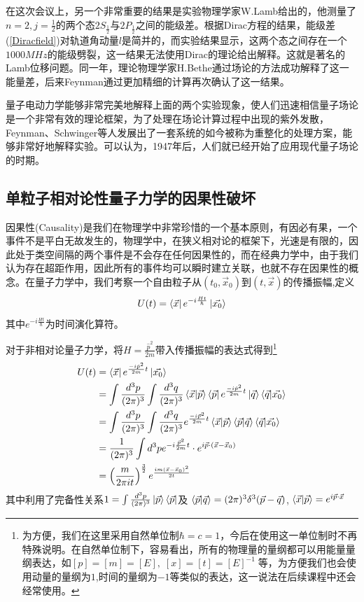 在这次会议上，另一个非常重要的结果是实验物理学家W.Lamb给出的，他测量了$n=2,j=\frac{1}{2}$的两个态$2S_{\frac{1}{2}}$与$2P_{\frac{1}{2}}$之间的能级差。根据Dirac方程的结果，能级差(\ref{Diracfield})对轨道角动量$l$是简并的，而实验结果显示，这两个态之间存在一个$1000MHz$的能级劈裂，这一结果无法使用Dirac的理论给出解释。这就是著名的Lamb位移问题。同一年，理论物理学家H.Bethe通过场论的方法成功解释了这一能量差，后来Feynman通过更加精细的计算再次确认了这一结果。

量子电动力学能够非常完美地解释上面的两个实验现象，使人们迅速相信量子场论是一个非常有效的理论框架，为了处理在场论计算过程中出现的紫外发散，Feynman、Schwinger等人发展出了一套系统的如今被称为重整化的处理方案，能够非常好地解释实验。可以认为，1947年后，人们就已经开始了应用现代量子场论的时期。

\subsection{单粒子相对论性量子力学的因果性破坏}
\label{foot1}
因果性(Causality)是我们在物理学中非常珍惜的一个基本原则，有因必有果，一个事件不是平白无故发生的，物理学中，在狭义相对论的框架下，光速是有限的，因此处于类空间隔的两个事件是不会存在任何因果性的，而在经典力学中，由于我们认为存在超距作用，因此所有的事件均可以瞬时建立关联，也就不存在因果性的概念。在量子力学中，我们考察一个自由粒子从$(t_{0},\vec{x}_{0})$到$(t,\vec{x})$的传播振幅,定义
\begin{equation}
    U(t)=\bra{\vec{x}}e^{-i\frac{Ht}{\hbar}}\ket{\vec{x_{0}}}
\end{equation}
其中$e^{-i\frac{Ht}{\hbar}}$为时间演化算符。

对于非相对论量子力学，将$H=\frac{\hat{p}^{2}}{2m}$带入传播振幅的表达式得到\footnote{为方便，我们在这里采用自然单位制$\hbar=c=1$，今后在使用这一单位制时不再特殊说明。在自然单位制下，容易看出，所有的物理量的量纲都可以用能量量纲表达，如$[p]=[m]=[E],\;[x]=[t]=[E]^{-1}\;$等，为方便我们也会使用动量的量纲为$1$,时间的量纲为$-1$等类似的表达，这一说法在后续课程中还会经常使用。}
\begin{equation}
\begin{aligned}
U(t) &=\bra{\vec{x}}e^{\frac{-i\hat{p}^{2}}{2m}t}\ket{\vec{x_{0}}} \\
&=\int\frac{d^{3}p}{(2\pi)^{3}}\int\frac{d^{3}q}{(2\pi)^{3}}\bra{\vec{x}}\ket{\vec{p}}\bra{\vec{p}}e^{\frac{-i\hat{p}^{2}}{2m}t}\ket{\vec{q}}\bra{\vec{q}}\ket{\vec{x_{0}}} \\
&=\int\frac{d^{3}p}{(2\pi)^{3}}\int\frac{d^{3}q}{(2\pi)^{3}}e^{\frac{-i\vec{p}^{2}}{2m}t}\bra{\vec{x}}\ket{\vec{p}}\bra{\vec{p}}\ket{\vec{q}}\bra{\vec{q}}\ket{\vec{x_{0}}} \\
&=\frac{1}{(2\pi)^{3}}\int d^{3}p e^{-i\frac{\vec{p}^{2}}{2m}t}\cdot e^{i\vec{p}\cdot(\vec{x}-\vec{x}_{0})} \\
&=\left(\frac{m}{2\pi i t}\right)^{\frac{3}{2}}e^{\frac{im(\vec{x}-\vec{x}_{0})^{2}}{2t}}
\end{aligned}
\end{equation}
其中利用了完备性关系$1=\int\frac{d^{3}p}{(2\pi)^{3}}\ket{\vec{p}}\bra{\vec{p}}$及
$\braket{\vec{p}}{\vec{q}}=(2\pi)^{3}\delta^{3}(\vec{p}-\vec{q})$,$\;\bra{\vec{x}}\ket{\vec{p}}=e^{i\vec{p}\cdot \vec{x}}$

